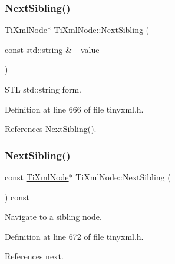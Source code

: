 \hypertarget{class_ti_xml_node_a1757c1f4d01e8c9596ffdbd561c76aea}{}\label{class_ti_xml_node_a1757c1f4d01e8c9596ffdbd561c76aea} 
\subsubsection{\texorpdfstring{Next\+Sibling()}{NextSibling()}\hspace{0.1cm}{\footnotesize\ttfamily [2/6]}}
{\footnotesize\ttfamily \hyperlink{class_ti_xml_node}{Ti\+Xml\+Node}$\ast$ Ti\+Xml\+Node\+::\+Next\+Sibling (\begin{DoxyParamCaption}\item[{const std\+::string \&}]{\+\_\+value }\end{DoxyParamCaption})\hspace{0.3cm}{\ttfamily [inline]}}



S\+TL std\+::string form. 



Definition at line 666 of file tinyxml.\+h.



References Next\+Sibling().

\hypertarget{class_ti_xml_node_ae99c572ac7901a15993ea7a4efaa10e7}{}\label{class_ti_xml_node_ae99c572ac7901a15993ea7a4efaa10e7} 
\subsubsection{\texorpdfstring{Next\+Sibling()}{NextSibling()}\hspace{0.1cm}{\footnotesize\ttfamily [3/6]}}
{\footnotesize\ttfamily const \hyperlink{class_ti_xml_node}{Ti\+Xml\+Node}$\ast$ Ti\+Xml\+Node\+::\+Next\+Sibling (\begin{DoxyParamCaption}{ }\end{DoxyParamCaption}) const\hspace{0.3cm}{\ttfamily [inline]}}



Navigate to a sibling node. 



Definition at line 672 of file tinyxml.\+h.



References next.



